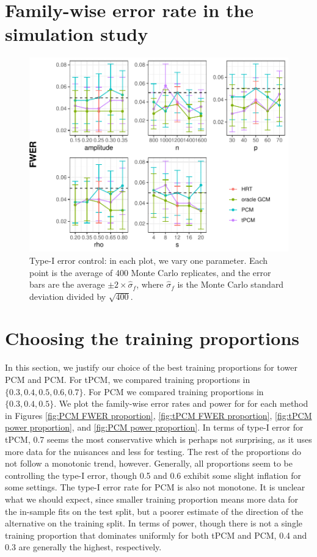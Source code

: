 \documentclass[12pt]{article}
\theoremstyle{definition}
\theoremstyle{remark}
\begin{document}
\section{Family-wise error rate in the simulation study} \label{sec:fwer}
\begin{figure}[H]
	\centering
	\includegraphics{figures/fwer_stat.pdf}
	\caption{Type-I error control: in each plot, we vary one parameter. Each point is the average of 400 Monte Carlo replicates, and the error bars are the average $\pm 2 \times \widehat{\sigma}_f$, where $\widehat{\sigma}_f$ is the Monte Carlo standard deviation divided by $\sqrt{400}$.}
	\label{fig:fwer}
\end{figure}

\section{Choosing the training proportions} \label{sec:choosing-training-proportions}
In this section, we justify our choice of the best training proportions for tower PCM and PCM. For tPCM, we compared training proportions in $\{0.3, 0.4, 0.5, 0.6, 0.7\}$. For PCM we compared training proportions in $\{0.3, 0.4, 0.5\}$. We plot the family-wise error rates and power for for each method in Figures \ref{fig:PCM FWER proportion}, \ref{fig:tPCM FWER proportion}, \ref{fig:tPCM power proportion}, and \ref{fig:PCM power proportion}. In terms of type-I error for tPCM, 0.7 seems the most conservative which is perhaps not surprising, as it uses more data for the nuisances and less for testing. The rest of the proportions do not follow a monotonic trend, however. Generally, all proportions seem to be controlling the type-I error, though 0.5 and 0.6 exhibit some slight inflation for some settings. The type-I error rate for PCM is also not monotone. It is unclear what we should expect, since smaller training proportion means more data for the in-sample fits on the test split, but a poorer estimate of the direction of the alternative on the training split. In terms of power, though there is not a single training proportion that dominates uniformly for both tPCM and PCM, 0.4 and 0.3 are generally the highest, respectively. 
\end{document}
